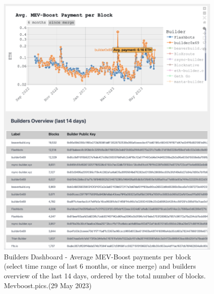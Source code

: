 \documentclass[UTF8]{article}
\begin{document}
\begin{figure}[htbp]
\begin{center}
\includegraphics[width=0.9\linewidth]{images/mevbuilder4}
\caption{Builders Dashboard - Average MEV-Boost payments per block (select time range of last 6 months, or since merge) and builders overview of the last 14 days, ordered by the total number of blocks. Mevboost.pics.(29 May 2023)}
\label{fig:mevbuilder4}
\end{center}
\end{figure}
\end{document}
